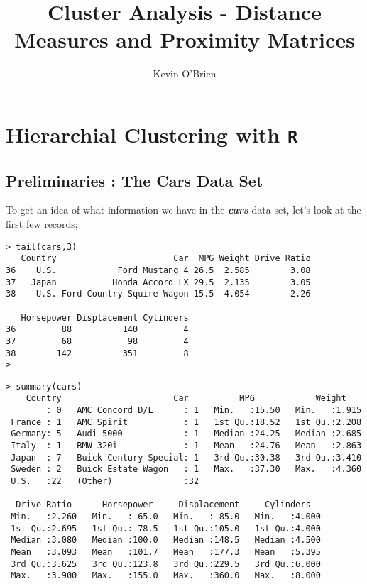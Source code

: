 \documentclass[12pt]{article}
\begin{document}
\author{Kevin O'Brien}
\Large
\title{Cluster Analysis - Distance Measures and Proximity Matrices}
\section{Hierarchial Clustering with \texttt{R}}
\tableofcontents
\newpage




\subsection{Preliminaries : The Cars Data Set}
To get an idea of what information we have in the \textbf{\textit{cars}} data set, let's look at the first few records;
{
\large
\begin{framed}
\begin{verbatim} 
> tail(cars,3)
   Country                       Car  MPG Weight Drive_Ratio
36    U.S.            Ford Mustang 4 26.5  2.585        3.08
37   Japan           Honda Accord LX 29.5  2.135        3.05
38    U.S. Ford Country Squire Wagon 15.5  4.054        2.26

   Horsepower Displacement Cylinders
36         88          140         4
37         68           98         4
38        142          351         8
> 

\end{verbatim}
\end{framed}
}
\newpage
{
\large
\begin{verbatim}
> summary(cars)
    Country                      Car          MPG            Weight     
        : 0   AMC Concord D/L      : 1   Min.   :15.50   Min.   :1.915  
 France : 1   AMC Spirit           : 1   1st Qu.:18.52   1st Qu.:2.208  
 Germany: 5   Audi 5000            : 1   Median :24.25   Median :2.685  
 Italy  : 1   BMW 320i             : 1   Mean   :24.76   Mean   :2.863  
 Japan  : 7   Buick Century Special: 1   3rd Qu.:30.38   3rd Qu.:3.410  
 Sweden : 2   Buick Estate Wagon   : 1   Max.   :37.30   Max.   :4.360  
 U.S.   :22   (Other)              :32                        
           
  Drive_Ratio      Horsepower     Displacement     Cylinders    
 Min.   :2.260   Min.   : 65.0   Min.   : 85.0   Min.   :4.000  
 1st Qu.:2.695   1st Qu.: 78.5   1st Qu.:105.0   1st Qu.:4.000  
 Median :3.080   Median :100.0   Median :148.5   Median :4.500  
 Mean   :3.093   Mean   :101.7   Mean   :177.3   Mean   :5.395  
 3rd Qu.:3.625   3rd Qu.:123.8   3rd Qu.:229.5   3rd Qu.:6.000  
 Max.   :3.900   Max.   :155.0   Max.   :360.0   Max.   :8.000  
\end{verbatim}
}
\newpage
\end{document}
